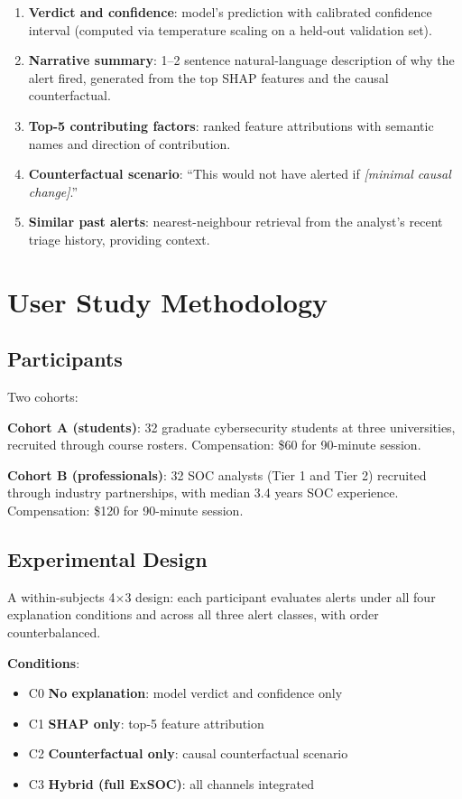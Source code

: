 \documentclass[sigconf,nonacm]{acmart}
\begin{document}
\begin{enumerate}
  \item \textbf{Verdict and confidence}: model's prediction with calibrated
        confidence interval (computed via temperature scaling on a
        held-out validation set).
  \item \textbf{Narrative summary}: 1--2 sentence natural-language
        description of why the alert fired, generated from the top SHAP
        features and the causal counterfactual.
  \item \textbf{Top-5 contributing factors}: ranked feature attributions
        with semantic names and direction of contribution.
  \item \textbf{Counterfactual scenario}: ``This would not have alerted if
        \emph{[minimal causal change]}.''
  \item \textbf{Similar past alerts}: nearest-neighbour retrieval from the
        analyst's recent triage history, providing context.
\end{enumerate}

\section{User Study Methodology}
\label{sec:method}

\subsection{Participants}

Two cohorts:

\textbf{Cohort A (students)}: 32 graduate cybersecurity students at three
universities, recruited through course rosters. Compensation: \$60 for
90-minute session.

\textbf{Cohort B (professionals)}: 32 SOC analysts (Tier 1 and Tier 2)
recruited through industry partnerships, with median 3.4 years SOC
experience. Compensation: \$120 for 90-minute session.

\subsection{Experimental Design}

A within-subjects 4$\times$3 design: each participant evaluates alerts
under all four explanation conditions and across all three alert classes,
with order counterbalanced.

\textbf{Conditions}:
\begin{itemize}
  \item C0 \textbf{No explanation}: model verdict and confidence only
  \item C1 \textbf{SHAP only}: top-5 feature attribution
  \item C2 \textbf{Counterfactual only}: causal counterfactual scenario
  \item C3 \textbf{Hybrid (full \textsc{ExSOC})}: all channels integrated
\end{itemize}
\end{document}
